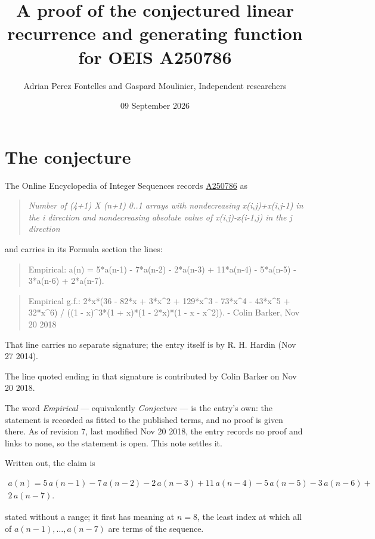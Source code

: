 \documentclass[11pt]{article}
\title{A proof of the conjectured linear recurrence and generating function for OEIS A250786}
\author{Adrian Perez Fontelles and Gaspard Moulinier, Independent researchers}
\date{09 September 2026}
\theoremstyle{definition}
\begin{document}
\maketitle
\section{The conjecture}

The Online Encyclopedia of Integer Sequences records \href{https://oeis.org/A250786}{A250786} as

\begin{quote}\itshape Number of (4+1) X (n+1) 0..1 arrays with nondecreasing x(i,j)+x(i,j-1) in the i direction and nondecreasing absolute value of x(i,j)-x(i-1,j) in the j direction\end{quote}

and carries in its Formula section the lines:

\begin{quote}\ttfamily Empirical: a(n) = 5*a(n-1) - 7*a(n-2) - 2*a(n-3) + 11*a(n-4) - 5*a(n-5) - 3*a(n-6) + 2*a(n-7).\end{quote}

\begin{quote}\ttfamily Empirical g.f.: 2*x*(36 - 82*x + 3*x\textasciicircum{}2 + 129*x\textasciicircum{}3 - 73*x\textasciicircum{}4 - 43*x\textasciicircum{}5 + 32*x\textasciicircum{}6) / ((1 - x)\textasciicircum{}3*(1 + x)*(1 - 2*x)*(1 - x - x\textasciicircum{}2)). - Colin Barker, Nov 20 2018\end{quote}

That line carries no separate signature; the entry itself is by R. H. Hardin (Nov 27 2014).

The line quoted ending in that signature is contributed by Colin Barker on Nov 20 2018.

The word {\itshape Empirical} --- equivalently {\itshape Conjecture} --- is the entry's own: the statement is recorded as fitted to the published terms, and no proof is given there. As of revision 7, last modified Nov 20 2018, the entry records no proof and links to none, so the statement is open. This note settles it.

Written out, the claim is

\begin{multline*} a(n) = 5\,a(n-1) - 7\,a(n-2) - 2\,a(n-3) + 11\,a(n-4) - 5\,a(n-5) - 3\,a(n-6) + \\ 2\,a(n-7). \end{multline*}

stated without a range; it first has meaning at $n = 8$, the least index at which all of $a(n-1),\dots,a(n-7)$ are terms of the sequence.
\end{document}
